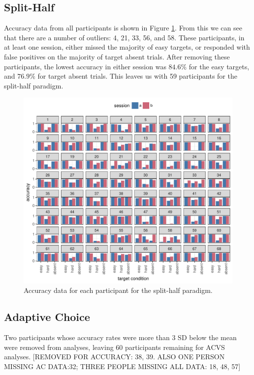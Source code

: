 \documentclass[a4paper, oneside, 11pt, onecolumn]{article}
\begin{document}
\subsection{Split-Half}

Accuracy data from all participants is shown in Figure \ref{fig:splithalf_acc_all}. From this we can see that there are a number of outliers: 4, 21, 33, 56, and 58. These participants, in at least one session, either missed the majority of easy targets, or responded with false positives on the majority of target absent trials. After removing these participants, the lowest accuracy in either session was $84.6\%$ for the easy targets, and $76.9\%$ for target absent trials. This leaves us with 59 participants for the split-half paradigm. 

\begin{figure}
\centering
\includegraphics[width=14cm]{../Scripts/lineseg/scratch/acc_by_session_by_person.pdf}
\caption{Accuracy data for each participant for the split-half paradigm.}
\label{fig:splithalf_acc_all}
\end{figure}

\subsection{Adaptive Choice}

Two participants whose accuracy rates were more than 3 SD below the mean were removed from analyses, leaving 60 participants remaining for ACVS analyses. [REMOVED FOR ACCURACY: 38, 39. ALSO ONE PERSON MISSING AC DATA:32; THREE PEOPLE MISSING ALL DATA: 18, 48, 57]
\end{document}
